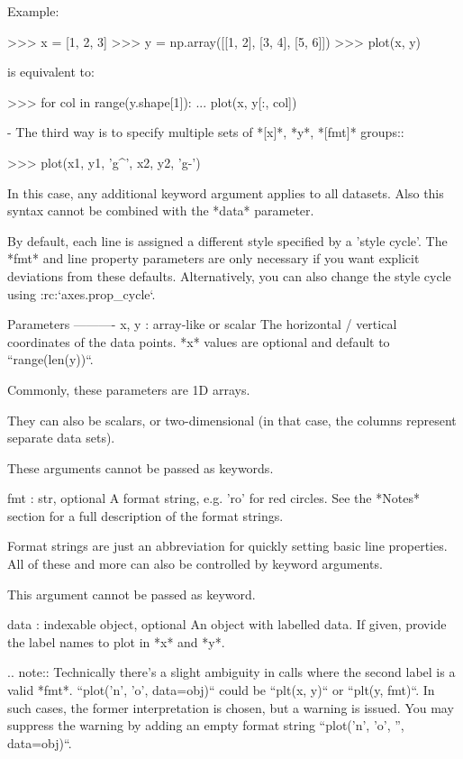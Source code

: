 \begin{DoxyVerb}
\begin{DoxyVerb}
  Example:

  >>> x = [1, 2, 3]
  >>> y = np.array([[1, 2], [3, 4], [5, 6]])
  >>> plot(x, y)

  is equivalent to:

  >>> for col in range(y.shape[1]):
  ...     plot(x, y[:, col])

- The third way is to specify multiple sets of *[x]*, *y*, *[fmt]*
  groups::

  >>> plot(x1, y1, 'g^', x2, y2, 'g-')

  In this case, any additional keyword argument applies to all
  datasets. Also this syntax cannot be combined with the *data*
  parameter.

By default, each line is assigned a different style specified by a
'style cycle'. The *fmt* and line property parameters are only
necessary if you want explicit deviations from these defaults.
Alternatively, you can also change the style cycle using
:rc:`axes.prop_cycle`.


Parameters
----------
x, y : array-like or scalar
    The horizontal / vertical coordinates of the data points.
    *x* values are optional and default to ``range(len(y))``.

    Commonly, these parameters are 1D arrays.

    They can also be scalars, or two-dimensional (in that case, the
    columns represent separate data sets).

    These arguments cannot be passed as keywords.

fmt : str, optional
    A format string, e.g. 'ro' for red circles. See the *Notes*
    section for a full description of the format strings.

    Format strings are just an abbreviation for quickly setting
    basic line properties. All of these and more can also be
    controlled by keyword arguments.

    This argument cannot be passed as keyword.

data : indexable object, optional
    An object with labelled data. If given, provide the label names to
    plot in *x* and *y*.

    .. note::
Technically there's a slight ambiguity in calls where the
second label is a valid *fmt*. ``plot('n', 'o', data=obj)``
could be ``plt(x, y)`` or ``plt(y, fmt)``. In such cases,
the former interpretation is chosen, but a warning is issued.
You may suppress the warning by adding an empty format string
``plot('n', 'o', '', data=obj)``.


\end{DoxyVerb}
\end{DoxyVerb}
